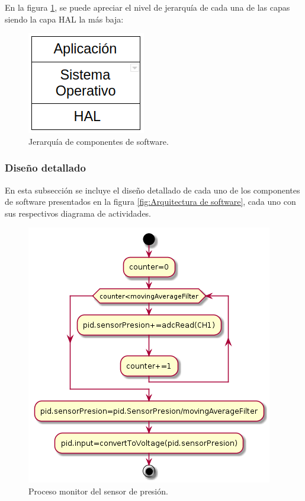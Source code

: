 En la figura \ref{fig:Capas de componentes de software}, se puede apreciar el nivel de jerarquía de cada una de las capas siendo la capa HAL la  más baja: 

\begin{figure}[htpb]
\centering
\includegraphics[scale=.75]{./Figures/JerarquiaDeCapas-Software.png}
\caption{Jerarquía de componentes de software.}
\label{fig:Capas de componentes de software}
\end{figure}

\subsubsection{Diseño detallado}
En esta subsección se incluye el diseño detallado de cada uno de los componentes de software presentados en la figura \ref{fig:Arquitectura de software}, cada uno con sus respectivos diagrama de actividades. 

	\begin{figure}[htpb]
	\centering
	\includegraphics[scale=.65]{./Figures/Procesomonitorsensordepresion.png}
	\caption{Proceso monitor del sensor de presión.}
	\label{fig:Control servomotor}
	\end{figure}
	
